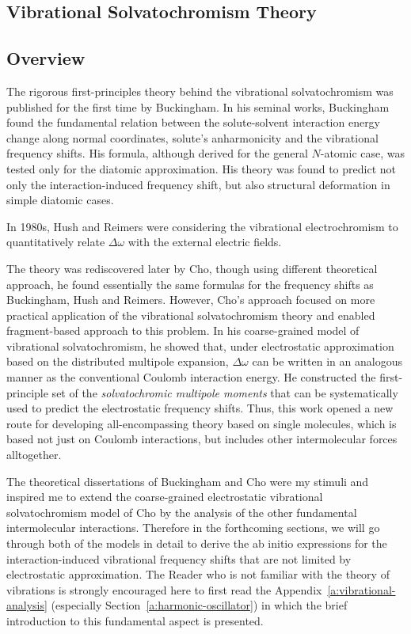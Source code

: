 \documentclass[a4paper,titlepage,twoside,fleqn,12pt]{book}
\begin{document}
\begin{refsection}
\chapter{Vibrational Solvatochromism Theory\label{c:background}}


\section{Overview\label{s:theory}}

The rigorous first-principles theory behind the vibrational solvatochromism was published
for the first time by Buckingham.\citep{Buckingham.TransFaradaySoc.1960} 
In his seminal works, Buckingham found the fundamental 
relation between the solute-solvent interaction energy change along normal 
coordinates, solute's anharmonicity and the vibrational frequency shifts.
His formula, although derived for the general $N$-atomic case, was tested
only for the diatomic approximation. His theory was found to predict not only
the interaction-induced frequency shift, but also structural deformation in simple
diatomic cases.

In 1980s, Hush and Reimers were considering the vibrational electrochromism
to quantitatively relate $\Delta \omega$ with the external electric fields.

The theory was rediscovered later by Cho, though using different theoretical
approach, he found essentially the same formulas for the frequency shifts as Buckingham, Hush
and Reimers. However, Cho's 
approach focused on more practical application of the vibrational solvatochromism 
theory and enabled fragment-based approach to this problem. In his coarse-grained
model of vibrational solvatochromism, he showed that,
under electrostatic approximation based on the distributed multipole expansion, 
$\Delta \omega$ can be written in an analogous manner as the conventional
Coulomb interaction energy. He constructed the first-principle set of 
the \emph{solvatochromic multipole moments} that can be systematically used
to predict the electrostatic frequency shifts. Thus, this work opened a new route for developing
all-encompassing theory based on single molecules, which is based not just on
Coulomb interactions, but includes other intermolecular forces alltogether.

The theoretical dissertations of Buckingham and Cho were my stimuli and inspired
me to extend the coarse-grained electrostatic vibrational solvatochromism 
model of Cho by the analysis of the other fundamental intermolecular interactions.
Therefore in the forthcoming sections, we will go through both of the models in detail
to derive the ab initio expressions for the interaction-induced 
vibrational frequency shifts that are not limited by electrostatic approximation.
The Reader who is not familiar with the theory of vibrations is strongly encouraged
here to first read the Appendix~\ref{a:vibrational-analysis} (especially Section~\ref{a:harmonic-oscillator})
in which the brief introduction to this fundamental aspect is presented.


\end{refsection}
\end{document}
